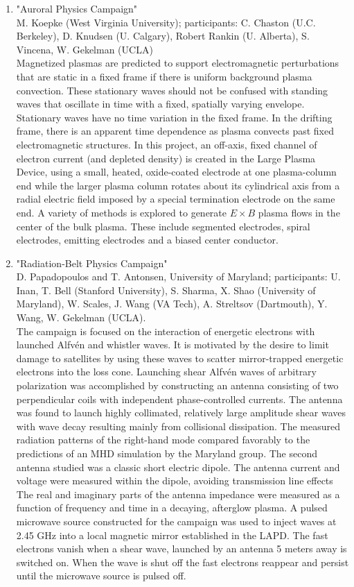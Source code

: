 \documentclass[11pt]{article}
\begin{document}
\begin{enumerate}
\item "Auroral Physics Campaign" \\ M. Koepke (West Virginia
  University); participants: C. Chaston (U.C. Berkeley), D. Knudsen
  (U. Calgary), Robert Rankin (U. Alberta), S. Vincena, W. Gekelman
  (UCLA) \\ Magnetized plasmas are
  predicted to support electromagnetic perturbations that are static
  in a fixed frame if there is uniform background plasma
  convection. These stationary waves should not be confused with
  standing waves that oscillate in time with a fixed, spatially
  varying envelope. Stationary waves have no time variation in the
  fixed frame. In the drifting frame, there is an apparent time
  dependence as plasma convects past fixed electromagnetic
  structures. In this project, an off-axis, fixed channel of electron
  current (and depleted density) is created in the Large Plasma
  Device, using a small, heated, oxide-coated electrode at one
  plasma-column end while the larger plasma column rotates about its
  cylindrical axis from a radial electric field imposed by a special
  termination electrode on the same end. A variety of methods is
  explored to generate $E\times B$ plasma flows in the center of the bulk
  plasma. These include segmented electrodes, spiral electrodes,
  emitting electrodes and a biased center conductor.
 
 
\item "Radiation-Belt Physics Campaign"\\ D. Papadopoulos and
  T. Antonsen, University of Maryland; participants: U. Inan, T. Bell
  (Stanford University), S. Sharma, X. Shao (University of Maryland),
  W. Scales, J. Wang (VA Tech), A. Streltsov (Dartmouth), Y. Wang,
  W. Gekelman (UCLA).\\ The
  campaign is focused on the interaction of energetic electrons with
  launched Alfv\'{e}n and whistler waves. It is motivated by the
  desire to limit damage to satellites by using these waves to scatter
  mirror-trapped energetic electrons into the loss cone. Launching
  shear Alfv\'{e}n waves of arbitrary polarization was accomplished by
  constructing an antenna consisting of two perpendicular coils with
  independent phase-controlled currents. The antenna was found to
  launch highly collimated, relatively large amplitude shear waves
  with wave decay resulting mainly from collisional dissipation. The
  measured radiation patterns of the right-hand mode compared
  favorably to the predictions of an MHD simulation by the Maryland
  group. The second antenna studied was a classic short electric
  dipole. The antenna current and voltage were measured within the
  dipole, avoiding transmission line effects The real and imaginary
  parts of the antenna impedance were measured as a function of
  frequency and time in a decaying, afterglow plasma. A pulsed
  microwave source constructed for the campaign was used to inject
  waves at 2.45 GHz into a local magnetic mirror established in the
  LAPD. The fast electrons vanish when a shear wave, launched by an
  antenna 5 meters away is switched on. When the wave is shut off the
  fast electrons reappear and persist until the microwave source is
  pulsed off.



\end{enumerate}
\end{document}
